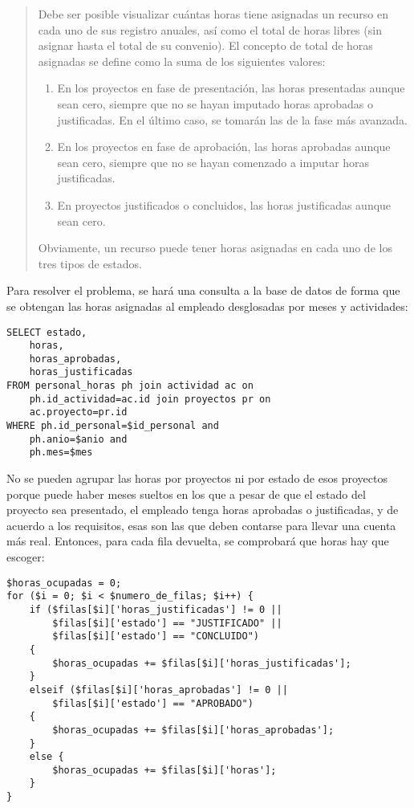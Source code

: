 \begin{quote}
Debe ser posible visualizar cuántas horas tiene asignadas un recurso en
cada uno de sus registro anuales, así como el total de horas libres (sin
asignar hasta el total de su convenio). El concepto de total de horas asignadas
se define como la suma de los siguientes valores:
 
\begin{enumerate}
\item En los proyectos en fase de presentación, las horas presentadas aunque
sean cero, siempre que no se hayan imputado horas aprobadas o justificadas. En
el último caso, se tomarán las de la fase más avanzada.

\item En los proyectos en fase de aprobación, las horas aprobadas aunque sean
cero, siempre que no se hayan comenzado a imputar horas justificadas.

\item En proyectos justificados o concluidos, las horas justificadas aunque
sean cero.
\end{enumerate}

Obviamente, un recurso puede tener horas asignadas en cada uno de los tres
tipos de estados.
\end{quote}

Para resolver el problema, se hará una consulta a la base de datos de forma que
se obtengan las horas asignadas al empleado desglosadas por meses y actividades:
\begin{lstlisting}
SELECT estado,
	horas,
	horas_aprobadas,
	horas_justificadas
FROM personal_horas ph join actividad ac on 
	ph.id_actividad=ac.id join proyectos pr on 
	ac.proyecto=pr.id
WHERE ph.id_personal=$id_personal and 
	ph.anio=$anio and 
	ph.mes=$mes
\end{lstlisting}

No se pueden agrupar las horas por proyectos ni por estado de esos
proyectos porque puede haber meses sueltos en los que a pesar de que el estado
del proyecto sea presentado, el empleado tenga horas aprobadas o justificadas, y
de acuerdo a los requisitos, esas son las que deben contarse para llevar una
cuenta más real. Entonces, para cada fila devuelta, se comprobará que horas hay
que escoger:

\begin{lstlisting}
$horas_ocupadas = 0;
for ($i = 0; $i < $numero_de_filas; $i++) {
	if ($filas[$i]['horas_justificadas'] != 0 ||
		$filas[$i]['estado'] == "JUSTIFICADO" ||
		$filas[$i]['estado'] == "CONCLUIDO")
	{
		$horas_ocupadas += $filas[$i]['horas_justificadas'];
	}
	elseif ($filas[$i]['horas_aprobadas'] != 0 || 
		$filas[$i]['estado'] == "APROBADO")
	{
		$horas_ocupadas += $filas[$i]['horas_aprobadas'];
	}
	else {
		$horas_ocupadas += $filas[$i]['horas'];
	}
}
\end{lstlisting}

